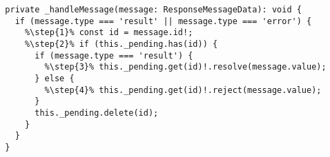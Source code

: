 \begin{verbatim}
  private _handleMessage(message: ResponseMessageData): void {
    if (message.type === 'result' || message.type === 'error') {
      %\step{1}% const id = message.id!;
      %\step{2}% if (this._pending.has(id)) {
        if (message.type === 'result') {
          %\step{3}% this._pending.get(id)!.resolve(message.value);
        } else {
          %\step{4}% this._pending.get(id)!.reject(message.value);
        }
        this._pending.delete(id);
      }
    }
  }
\end{verbatim}
